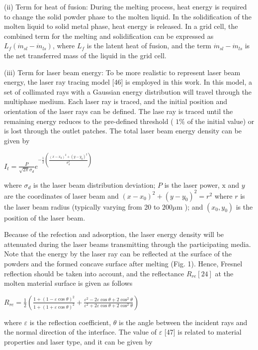 \documentclass[10pt]{article}
\begin{document}
(ii) Term for heat of fusion: During the melting process, heat energy is required to change the solid powder phase to the molten liquid. In the solidification of the molten liquid to solid metal phase, heat energy is released. In a grid cell, the combined term for the melting and solidification can be expressed as $L_{f}\left(\dot{m}_{s l}-\dot{m}_{l s}\right)$, where $L_{f}$ is the latent heat of fusion, and the term $\dot{m}_{s l}-\dot{m}_{l s}$ is the net transferred mass of the liquid in the grid cell.

(iii) Term for laser beam energy: To be more realistic to represent laser beam energy, the laser ray tracing model [46] is employed in this work. In this model, a set of collimated rays with a Gaussian energy distribution will travel through the multiphase medium. Each laser ray is traced, and the initial position and orientation of the laser rays can be defined. The lase ray is traced until the remaining energy reduces to the pre-defined threshold ( $1 \%$ of the initial value) or is lost through the outlet patches. The total laser beam energy density can be given by

$I_{t}=\frac{P}{\sqrt{2 \pi} \sigma_{d}} e^{-\frac{1}{2}\left(\frac{\left(x-x_{0}\right)^{2}+\left(y-y_{0}\right)^{2}}{\sigma_{d}^{2}}\right)}$

where $\sigma_{d}$ is the laser beam distribution deviation; $P$ is the laser power, $\mathrm{x}$ and $y$ are the coordinates of laser beam and $\left(x-x_{0}\right)^{2}+\left(y-y_{0}\right)^{2}=r^{2}$ where $r$ is the laser beam radius (typically varying from 20 to $200 \mu \mathrm{m}$ ); and $\left(x_{0}, y_{0}\right)$ is the position of the laser beam.

Because of the refection and adsorption, the laser energy density will be attenuated during the laser beams transmitting through the participating media. Note that the energy by the laser ray can be reflected at the surface of the powders and the formed concave surface after melting (Fig. 1). Hence, Fresnel reflection should be taken into account, and the reflectance $R_{r e}[24]$ at the molten material surface is given as follows

$R_{r e}=\frac{1}{2}\left(\frac{1+(1-\varepsilon \cos \theta)^{2}}{1+(1+\varepsilon \cos \theta)^{2}}+\frac{\varepsilon^{2}-2 \varepsilon \cos \theta+2 \cos ^{2} \theta}{\varepsilon^{2}+2 \varepsilon \cos \theta+2 \cos ^{2} \theta}\right)$

where $\varepsilon$ is the reflection coefficient, $\theta$ is the angle between the incident rays and the normal direction of the interface. The value of $\varepsilon$ [47] is related to material properties and laser type, and it can be given by
\end{document}
